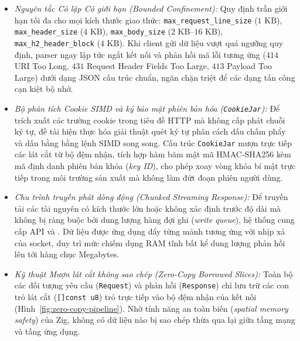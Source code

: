 \documentclass[letterpaper]{article}
\begin{document}
\begin{itemize}
    \item \textit{Nguyên tắc Cô lập Có giới hạn (\emph{Bounded Confinement}):} Quy định trần giới hạn tối đa cho mọi kích thước giao thức: \texttt{max\_request\_line\_size} ($1\text{ KB}$), \texttt{max\_header\_size} ($4\text{ KB}$), \texttt{max\_body\_size} ($2\text{ KB}\text{--}16\text{ KB}$), \texttt{max\_h2\_header\_block} ($4\text{ KB}$). Khi client gửi dữ liệu vượt quá ngưỡng quy định, parser ngay lập tức ngắt kết nối và phản hồi mã lỗi tương ứng ($414$ URI Too Long, $431$ Request Header Fields Too Large, $413$ Payload Too Large) dưới dạng JSON cấu trúc chuẩn, ngăn chặn triệt để các dạng tấn công cạn kiệt bộ nhớ.
    \item \textit{Bộ phân tích Cookie SIMD và ký bảo mật phiên bản hóa (\texttt{CookieJar}):}
    Để trích xuất các trường cookie trong tiêu đề HTTP mà không cấp phát chuỗi ký tự, đề tài hiện thực hóa giải thuật quét ký tự phân cách dấu chấm phẩy và dấu bằng bằng lệnh SIMD song song. Cấu trúc \texttt{CookieJar} mượn trực tiếp các lát cắt từ bộ đệm nhận, tích hợp hàm băm mật mã HMAC-SHA256 kèm mã định danh phiên bản khóa (\emph{key ID}), cho phép xoay vòng khóa bí mật trực tiếp trong môi trường sản xuất mà không làm đứt đoạn phiên người dùng.
    \item \textit{Chu trình truyền phát dòng động (\emph{Chunked Streaming Response}):}
    Để truyền tải các tài nguyên có kích thước lớn hoặc không xác định trước độ dài mà không bị ràng buộc bởi dung lượng hàng đợi ghi (\emph{write queue}), hệ thống cung cấp API  và . Dữ liệu được ứng dụng đẩy từng mảnh tương ứng với nhịp xả của socket, duy trì mức chiếm dụng RAM tĩnh bất kể dung lượng phản hồi lên tới hàng chục Megabytes.
    \item \textit{Kỹ thuật Mượn lát cắt không sao chép (\emph{Zero-Copy Borrowed Slices}):} Toàn bộ các đối tượng yêu cầu (\texttt{Request}) và phản hồi (\texttt{Response}) chỉ lưu trữ các con trỏ lát cắt (\texttt{[]const u8}) trỏ trực tiếp vào bộ đệm nhận của kết nối (Hình~\ref{fig:zero-copy-pipeline}). Nhờ tính năng an toàn biên (\emph{spatial memory safety}) của Zig, không có dữ liệu nào bị sao chép thừa qua lại giữa tầng mạng và tầng ứng dụng.
\end{itemize}
\end{document}

